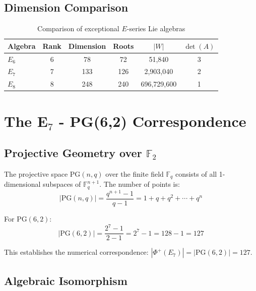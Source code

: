 \subsection{Dimension Comparison}

\begin{table}[h]
\centering
\begin{tabular}{lccccc}
\toprule
Algebra & Rank & Dimension & Roots & $|W|$ & $\det(A)$ \\
\midrule
$E_6$ & 6 & 78 & 72 & 51,840 & 3 \\
$E_7$ & 7 & 133 & 126 & 2,903,040 & 2 \\
$E_8$ & 8 & 248 & 240 & 696,729,600 & 1 \\
\bottomrule
\end{tabular}
\caption{Comparison of exceptional $E$-series Lie algebras}
\label{tab:e_series_comparison}
\end{table}

\section{The E$_7$ - PG(6,2) Correspondence}

\subsection{Projective Geometry over $\mathbb{F}_2$}

\begin{definition}
\label{def:projective_space}
The projective space PG$(n,q)$ over the finite field $\mathbb{F}_q$ consists of all 1-dimensional subspaces of $\mathbb{F}_q^{n+1}$. The number of points is:
\begin{equation}
|\text{PG}(n,q)| = \frac{q^{n+1} - 1}{q - 1} = 1 + q + q^2 + \cdots + q^n
\end{equation}
\end{definition}

\begin{theorem}
\label{thm:pg62_points}
For PG$(6,2)$:
\begin{equation}
|\text{PG}(6,2)| = \frac{2^7 - 1}{2 - 1} = 2^7 - 1 = 128 - 1 = 127
\end{equation}
\end{theorem}

This establishes the numerical correspondence: $|\Phi^+(E_7)| = |\text{PG}(6,2)| = 127$.

\subsection{Algebraic Isomorphism}

